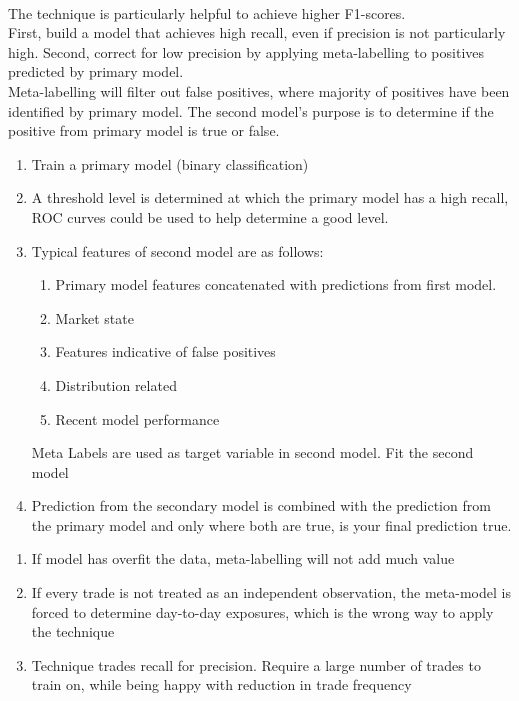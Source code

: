 \begin{method} \\
The technique is particularly helpful to achieve higher F1-scores.\\
First, build a model that achieves high recall, even if precision is not particularly high. Second, correct for low precision by applying meta-labelling to positives predicted by primary model.\\
Meta-labelling will filter out false positives, where majority of positives have been identified by primary model. The second model's purpose is to determine if the positive from primary model is true or false.
\begin{enumerate}[label=\roman*.]
\setlength{\itemsep}{0pt}
\item Train a primary model (binary classification)
\item A threshold level is determined at which the primary model has a high recall, ROC curves could be used to help determine a good level.
\item Typical features of second model are as follows:
\begin{enumerate}[label=\roman*.]
\setlength{\itemsep}{0pt}
\item Primary model features concatenated with predictions from first model.
\item Market state
\item Features indicative of false positives
\item Distribution related
\item Recent model performance
\end{enumerate}
Meta Labels are used as target variable in second model. Fit the second model
\item Prediction from the secondary model is combined with the prediction from the primary model and only where both are true, is your final prediction true.
\end{enumerate}
\end{method}

\begin{remark} 
\begin{enumerate}[label=\roman*.]
\setlength{\itemsep}{0pt}
\item If model has overfit the data, meta-labelling will not add much value
\item If every trade is not treated as an independent observation, the meta-model is forced to determine day-to-day exposures, which is the wrong way to apply the technique
\item Technique trades recall for precision. Require a large number of trades to train on, while being happy with reduction in trade frequency
\end{enumerate}
\end{remark}

